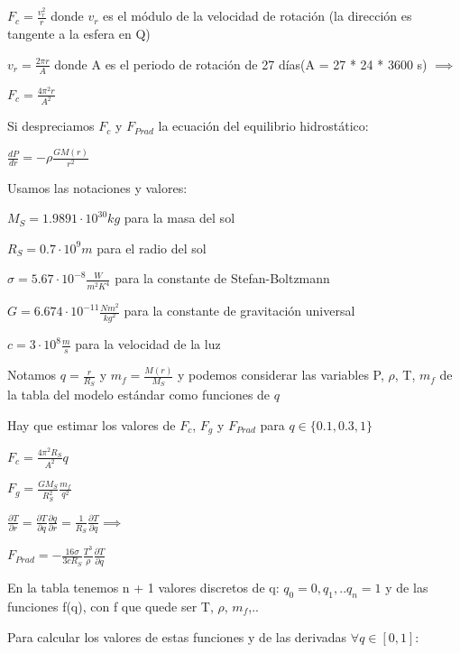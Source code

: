 \documentclass[10pt]{book}
\begin{document}
$F_c = \frac {v_r^2}{r}$ donde $v_r$ es el módulo de la velocidad de rotación (la dirección es tangente a la esfera en Q)

$v_r = \frac{2 \pi r}{A} $ donde A es el periodo de rotación de 27 días(A = 27 * 24 * 3600 s) $\implies$

$F_c = \frac {4 \pi^2 r}{A^2}$

Si despreciamos $F_c$ y  $F_{Prad}$ la ecuación del equilibrio hidrostático:

$ \frac{d P}{d r} = -\rho \frac{G M(r)}{r^2}$

Usamos las notaciones y valores:
\begin{description}
\item $M_S = 1.9891 \cdot 10^{30} kg$ para la masa del sol
\item $R_S = 0.7 \cdot 10^9 m$ para el radio del sol
\item $\sigma = 5.67 \cdot 10^{-8} \frac{W}{m^2 K^4}$ para la constante de Stefan-Boltzmann
\item $G = 6.674 \cdot 10^{-11} \frac{N m^2}{kg^2}$ para la constante de gravitación universal
\item $c = 3 \cdot 10^{8} \frac{m}{s}$ para la velocidad de la luz

\end{description}

Notamos $q = \frac{r}{R_S}$ y $m_f = \frac{M(r)}{M_S}$ 
y podemos considerar las variables P, $\rho$, T, $m_f$ de la tabla del modelo estándar como funciones de $q$

Hay que estimar los valores de $F_c$, $F_g$ y $F_{Prad}$ para  $q \in \{0.1, 0.3, 1\}$

$F_c = \frac {4 \pi^2 R_S}{A^2} q$
 

$F_g = \frac {G M_S}{R_S^2} \frac{m_f}{q^2} $

$\frac {\partial T}{\partial r} = \frac {\partial T}{\partial q}   \frac {\partial q}{\partial r} =  \frac {1}{R_S}  \frac {\partial T}{\partial q} \implies $

$F_{Prad} = -\frac {16 \sigma}{3 c R_S} \frac {T^3}{\rho} \frac {\partial T}{\partial q}$

En la tabla tenemos n + 1 valores discretos de q: $q_0=0, q_1, .. q_n = 1$
y de las funciones f(q), con f que quede ser T, $\rho$, $m_f$,.. 
 
Para calcular los valores de estas funciones y de las derivadas $\forall q \in [0,1]$:
\end{document}
